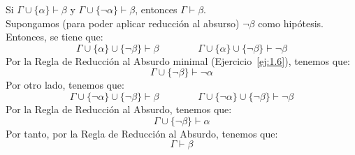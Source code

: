 \begin{ejercicio}\label{ej:1.15}
    Si $\Gamma \cup \{\alpha\} \vdash \beta$ y $\Gamma \cup \{\neg\alpha\} \vdash \beta$, entonces $\Gamma \vdash \beta$.\\

    Supongamos (para poder aplicar reducción al absurso) $\neg\beta$ como hipótesis. Entonces, se tiene que:
    \begin{equation*}
        \Gamma \cup \{\alpha\}\cup \{\neg\beta\} \vdash \beta\qquad\qquad\Gamma \cup \{\alpha\}\cup \{\neg\beta\} \vdash \neg\beta
    \end{equation*}
    Por la Regla de Reducción al Absurdo minimal (Ejercicio~\ref{ej:1.6}), tenemos que:
    \begin{equation*}
        \Gamma \cup \{\neg\beta\} \vdash \neg\alpha
    \end{equation*}
    Por otro lado, tenemos que:
    \begin{equation*}
        \Gamma \cup \{\neg\alpha\}\cup \{\neg\beta\} \vdash \beta\qquad\qquad\Gamma \cup \{\neg\alpha\}\cup \{\neg\beta\} \vdash \neg\beta
    \end{equation*}
    Por la Regla de Reducción al Absurdo, tenemos que:
    \begin{equation*}
        \Gamma \cup \{\neg\beta\} \vdash \alpha
    \end{equation*}
    Por tanto, por la Regla de Reducción al Absurdo, tenemos que:
    \begin{equation*}
        \Gamma \vdash \beta
    \end{equation*}
\end{ejercicio}

